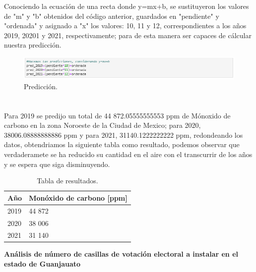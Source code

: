\documentclass[12pt]{article}
\begin{document}
    Conociendo la ecuación de una recta donde y=mx+b, se sustituyeron los valores de "m" y "b" obtenidos del código anterior, guardados en "pendiente" y "ordenada" y asignado a "x" los valores: 10, 11 y 12, correspondientes a los años 2019, 20201 y 2021, respectivamente; para de esta manera ser capaces de cálcular nuestra predicción.
         \begin{figure}[h] 
          \centering 
            \includegraphics[width=12cm]{Pred13.png}
                \caption{Predicción.}
                \label{fig:15}
                 \end{figure}  

 \section{}
 Para 2019 se predijo un total de 44 872.05555555553 ppm de Mónoxido de carbono en la zona Noroeste de la Ciudad de Mexico; para 2020, 38006.08888888886 ppm y para 2021, 31140.1222222222 ppm, redondeando los datos, obtendriamos la siguiente tabla como resultado, podemos observar que verdaderamete se ha reducido su cantidad en el aire con el transcurrir de los años y se espera que siga disminuyendo.
 \begin{table}[h!]
  \centering
        \begin{tabular}{ |p{3cm}|p{3cm}|}
         \hline
         Año & Monóxido de carbono [ppm]\\ 
         \hline
         2019  & 44 872\\
         \hline 
         2020  & 38 006 \\
          \hline
         2021  &  31 140 \\
          \hline
         \end{tabular}
               \vspace{1em}
         \caption{Tabla de resultados.}
        \label{tab:1}
    \end{table}
 
 \newpage
 \begin{center}
\begin{spacing}{2} %
\textbf{\large Análisis de número de casillas de votación electoral a instalar en el estado de Guanjauato}
 \end{spacing}
 \end{center}
\end{document}
